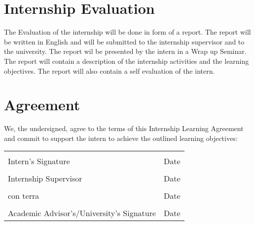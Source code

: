 \documentclass[11pt, titlepage, a4paper]{article}
\begin{document}
\section{Internship Evaluation}
The Evaluation of the internship will be done in form of a report. The report will be written in English and will be submitted to the internship supervisor and to the university. The report wil be presented by the intern in a Wrap up Seminar. The report will contain a description of the internship activities and the learning objectives. The report will also contain a self evaluation of the intern. 

\section{Agreement}

We, the undersigned, agree to the terms of this Internship Learning Agreement and commit to support the intern to achieve the outlined learning objectives:
\\[48pt]
\noindent
\begin{tabular}{@{}p{2.5in}p{2.5in}@{}}
  \dotfill & \dotfill \\
  Intern's Signature & Date \\[5\bigskipamount]
  \dotfill & \dotfill \\
  Internship Supervisor & Date \\[5\bigskipamount]
  \dotfill & \dotfill \\
  con terra & Date \\[5\bigskipamount]
  \dotfill & \dotfill \\
  Academic Advisor's/University's Signature & Date \\[5\bigskipamount]


\end{tabular}
\end{document}
